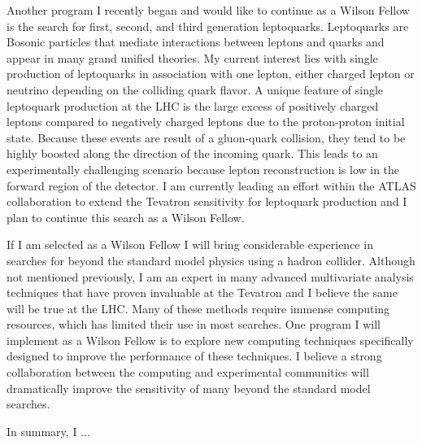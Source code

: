 \documentclass[12pt]{article}
\begin{document}
Another program I recently began and would like to continue as a Wilson Fellow is the search for first, second, and third generation leptoquarks. Leptoquarks are Bosonic particles that mediate interactions between leptons and quarks and appear in many grand unified theories. My current interest lies with single production of leptoquarks in association with one lepton, either charged lepton or neutrino depending on the colliding quark flavor. A unique feature of single leptoquark production at the LHC is the large excess of positively charged leptons compared to negatively charged leptons due to the proton-proton initial state. Because these events are result of a gluon-quark collision, they tend to be highly boosted along the direction of the incoming quark. This leads to an experimentally challenging scenario because lepton reconstruction is low in the forward region of the detector. I am currently leading an effort within the ATLAS collaboration to extend the Tevatron sensitivity for leptoquark production and I plan to continue this search as a Wilson Fellow. 

If I am selected as a Wilson Fellow I will bring considerable experience in searches for beyond the standard model physics using a hadron collider. Although not mentioned previously, I am an expert in many advanced multivariate analysis techniques that have proven invaluable at the Tevatron and I believe the same will be true at the LHC. Many of these methods require immense computing resources, which has limited their use in most searches. One program I will implement as a Wilson Fellow is to explore new computing techniques specifically designed to improve the performance of these techniques. I believe a strong collaboration between the computing and experimental communities will dramatically improve the sensitivity of many beyond the standard model searches.

In summary, I ...
\end{document}
